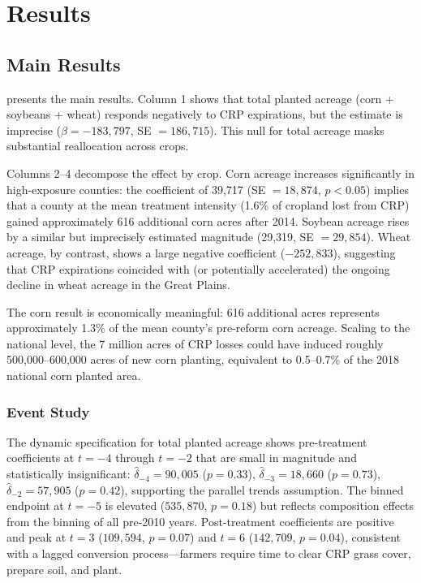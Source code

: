 \documentclass[12pt]{article}
\begin{document}
\section{Results}

\subsection{Main Results}



 presents the main results. Column 1 shows that total planted acreage (corn + soybeans + wheat) responds negatively to CRP expirations, but the estimate is imprecise ($\beta = -183{,}797$, SE $= 186{,}715$). This null for total acreage masks substantial reallocation across crops.

Columns 2--4 decompose the effect by crop. Corn acreage increases significantly in high-exposure counties: the coefficient of 39,717 (SE $= 18{,}874$, $p < 0.05$) implies that a county at the mean treatment intensity (1.6\% of cropland lost from CRP) gained approximately 616 additional corn acres after 2014. Soybean acreage rises by a similar but imprecisely estimated magnitude (29,319, SE $= 29{,}854$). Wheat acreage, by contrast, shows a large negative coefficient ($-252{,}833$), suggesting that CRP expirations coincided with (or potentially accelerated) the ongoing decline in wheat acreage in the Great Plains.

The corn result is economically meaningful: 616 additional acres represents approximately 1.3\% of the mean county's pre-reform corn acreage. Scaling to the national level, the 7 million acres of CRP losses could have induced roughly 500,000--600,000 acres of new corn planting, equivalent to 0.5--0.7\% of the 2018 national corn planted area.

\subsubsection*{Event Study} The dynamic specification for total planted acreage shows pre-treatment coefficients at $t = -4$ through $t = -2$ that are small in magnitude and statistically insignificant: $\hat{\delta}_{-4} = 90{,}005$ ($p = 0.33$), $\hat{\delta}_{-3} = 18{,}660$ ($p = 0.73$), $\hat{\delta}_{-2} = 57{,}905$ ($p = 0.42$), supporting the parallel trends assumption. The binned endpoint at $t = -5$ is elevated ($535{,}870$, $p = 0.18$) but reflects composition effects from the binning of all pre-2010 years. Post-treatment coefficients are positive and peak at $t = 3$ ($109{,}594$, $p = 0.07$) and $t = 6$ ($142{,}709$, $p = 0.04$), consistent with a lagged conversion process---farmers require time to clear CRP grass cover, prepare soil, and plant.
\end{document}
